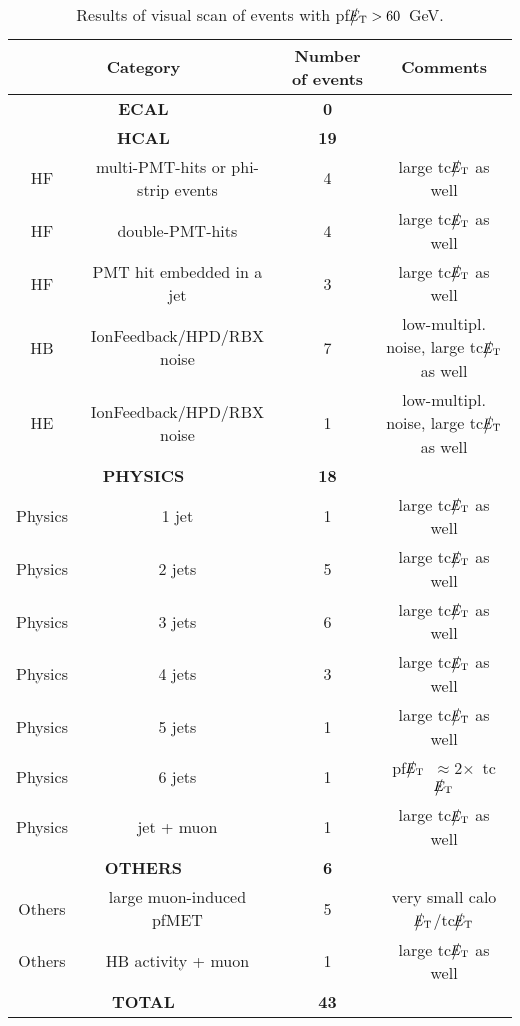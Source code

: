 %
%
\begin{table}[htbp]
  \begin{center}
    \begin{tabular}{|c|c|c|c|}
      \hline
      \multicolumn{2}{|c|}{Category} & Number of events  & Comments   \\ 
      \hline\hline
      \multicolumn{2}{|c|}{\bf ECAL} & \bf{0}      &  \\
      \hline    
      \multicolumn{2}{|c|}{\bf HCAL} & \bf{19}      &  \\
      \hline
      HF & multi-PMT-hits or phi-strip events & 4 & large tc$\big\slash\hspace{-1.6ex}{E_\text{T}}$ as well \\           
      HF & double-PMT-hits & 4 & large tc$\big\slash\hspace{-1.6ex}{E_\text{T}}$ as well \\           
      HF & PMT hit embedded in a jet & 3 & large tc$\big\slash\hspace{-1.6ex}{E_\text{T}}$ as well \\           
      HB & IonFeedback/HPD/RBX noise & 7 & low-multipl. noise, large tc$\big\slash\hspace{-1.6ex}{E_\text{T}}$ as well \\           
      HE & IonFeedback/HPD/RBX noise & 1 & low-multipl. noise, large tc$\big\slash\hspace{-1.6ex}{E_\text{T}}$ as well \\           
      \hline    
      \multicolumn{2}{|c|}{\bf PHYSICS} & \bf{18}      &  \\
      \hline
      Physics & 1 jet & 1 & large tc$\big\slash\hspace{-1.6ex}{E_\text{T}}$ as well \\
      Physics & 2 jets & 5 & large tc$\big\slash\hspace{-1.6ex}{E_\text{T}}$ as well \\
      Physics & 3 jets & 6 & large tc$\big\slash\hspace{-1.6ex}{E_\text{T}}$ as well \\
      Physics & 4 jets & 3 & large tc$\big\slash\hspace{-1.6ex}{E_\text{T}}$ as well \\
      Physics & 5 jets & 1 & large tc$\big\slash\hspace{-1.6ex}{E_\text{T}}$ as well\\
      Physics & 6 jets & 1 & pf$\big\slash\hspace{-1.6ex}{E_\text{T}}$~$\approx$2$\times$~tc$\big\slash\hspace{-1.6ex}{E_\text{T}}$\\
      Physics & jet + muon & 1 & large tc$\big\slash\hspace{-1.6ex}{E_\text{T}}$ as well \\ 
      \hline
      \multicolumn{2}{|c|}{\bf OTHERS} & \bf{6}      &  \\
      \hline          
      Others & large muon-induced pfMET & 5 & very small calo$\big\slash\hspace{-1.6ex}{E_\text{T}}$/tc$\big\slash\hspace{-1.6ex}{E_\text{T}}$ \\ 
      Others & HB activity + muon & 1 & large tc$\big\slash\hspace{-1.6ex}{E_\text{T}}$ as well \\
      \hline          
      \multicolumn{2}{|c|}{\bf TOTAL} & \bf{43}      &  \\
      \hline
    \end{tabular}
    \caption{Results of visual scan of events with pf$\big\slash\hspace{-1.6ex}{E_\text{T}}>60$~GeV.}    
    \label{tab:pfMETskim}
  \end{center}
\end{table}
